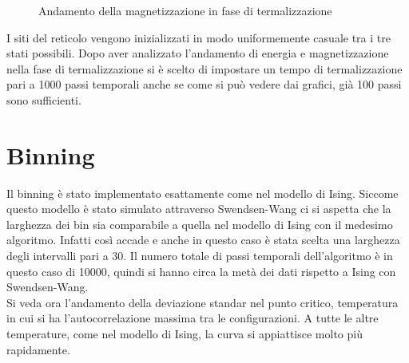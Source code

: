 \begin{figure}[h!]
{	}
	\caption{Andamento della magnetizzazione in fase di termalizzazione}
\end{figure}
I siti del reticolo vengono inizializzati in modo uniformemente casuale tra i tre stati possibili.
Dopo aver analizzato l'andamento di energia e magnetizzazione nella fase di termalizzazione si è scelto di impostare un tempo di termalizzazione pari a 1000 passi temporali anche se come si può vedere dai grafici, già 100 passi sono sufficienti.

\section{Binning}
Il binning è stato implementato esattamente come nel modello di Ising. Siccome questo modello è stato simulato attraverso Swendsen-Wang ci si aspetta che la larghezza dei bin sia comparabile a quella nel modello di Ising con il medesimo algoritmo. Infatti così accade e anche in questo caso è stata scelta una larghezza degli intervalli pari a 30. Il numero totale di passi temporali dell'algoritmo è in questo caso di 10000, quindi si hanno circa la metà dei dati rispetto a Ising con Swendsen-Wang.\\
Si veda ora l'andamento della deviazione standar nel punto critico, temperatura in cui si ha l'autocorrelazione massima tra le configurazioni. A tutte le altre temperature, come nel modello di Ising, la curva si appiattisce molto più rapidamente.
